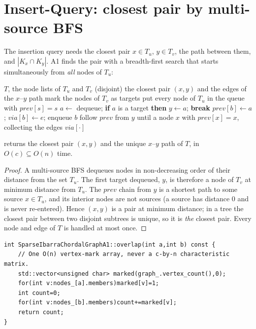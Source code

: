 \documentclass[11pt,a4paper,oneside]{report}
\theoremstyle{plain}
\theoremstyle{definition}
\theoremstyle{remark}
\DeclareRobustCommand{\code}[1]{\mtp_breakable_tt:n {#1}}
\DeclareRobustCommand{\file}[1]{\mtp_breakable_tt:n {#1}}
\begin{document}
\section{Insert-Query: closest pair by multi-source BFS}\label{sec:a1-insert-query}
The insertion query needs the closest pair \(x\in T_u\), \(y\in T_v\), the path between them,
and \(|K_x\cap K_y|\). A1 finds the pair with a breadth-first search that starts
simultaneously from \emph{all} nodes of \(T_u\):

\begin{algorithm}[ht]
\caption{Closest pair of A1 (\code{closest_pair})}\label{alg:closest-bfs}
\begin{algorithmic}[1]
\Require \(T\), the node lists of \(T_u\) and \(T_v\) (disjoint)
\Ensure the closest pair \((x,y)\) and the edges of the \(x\)--\(y\) path
\State mark the nodes of \(T_v\) as targets
\State put every node of \(T_u\) in the queue with \(\mathit{prev}[s]=s\)
  \State \(a\gets\) dequeue; \textbf{if} \(a\) is a target \textbf{then} \(y\gets a\); \textbf{break}
    \State \(\mathit{prev}[b]\gets a\); \(\mathit{via}[b]\gets e\); enqueue \(b\)
  \EndFor
\EndWhile
\State follow \(\mathit{prev}\) from \(y\) until a node \(x\) with \(\mathit{prev}[x]=x\), collecting the edges \(\mathit{via}[\cdot]\)
\end{algorithmic}
\end{algorithm}

\begin{lemma}\label{lem:bfs-closest}
 returns the closest pair \((x,y)\) and the unique \(x\)--\(y\) path of
\(T\), in \(O(c)\subseteq O(n)\) time.
\end{lemma}
\begin{proof}
A multi-source BFS dequeues nodes in non-decreasing order of their distance from the set
\(T_u\). The first target dequeued, \(y\), is therefore a node of \(T_v\) at minimum distance
from \(T_u\). The \(\mathit{prev}\) chain from \(y\) is a shortest path to some source \(x\in
T_u\), and its interior nodes are not sources (a source has distance 0 and is never re-entered).
Hence \((x,y)\) is a pair at minimum distance; in a tree the closest pair between two disjoint
subtrees is unique, so it is \emph{the} closest pair. Every node and edge of \(T\) is handled
at most once.
\end{proof}

\begin{lstlisting}[style=cpp,firstnumber=136,caption={\file{src/sparse_ibarra_a1.cpp}, lines 136--143: intersection size with a vertex mark array.},label={lst:a1-overlap}]
int SparseIbarraChordalGraphA1::overlap(int a,int b) const {
    // One O(n) vertex-mark array, never a c-by-n characteristic matrix.
    std::vector<unsigned char> marked(graph_.vertex_count(),0);
    for(int v:nodes_[a].members)marked[v]=1;
    int count=0;
    for(int v:nodes_[b].members)count+=marked[v];
    return count;
}
\end{lstlisting}
\end{document}
